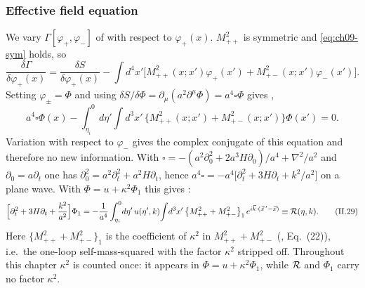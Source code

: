 \subsubsection{Effective field equation}
We vary $\Gamma[\varphi_+,\varphi_-]$ of  with respect to $\varphi_+(x)$. $M^2_{++}$ is symmetric and \eqref{eq:ch09-sym} holds, so
\begin{equation}
\frac{\delta\Gamma}{\delta\varphi_+(x)}=\frac{\delta S}{\delta\varphi_+(x)}-\int d^4x'\Big[M^2_{++}(x;x')\varphi_+(x')+M^2_{+-}(x;x')\varphi_-(x')\Big].
\label{eq:ch09-varGamma}
\end{equation}
Setting $\varphi_\pm=\Phi$ and using $\delta S/\delta\Phi=\partial_\mu(a^2\partial^\mu\Phi)=a^4\square\Phi$ gives ,
\begin{equation*}
a^4\square\Phi(x)-\int_{\eta_i}^0d\eta'\!\int d^3x'\,\big\{M^2_{++}(x;x')+M^2_{+-}(x;x')\big\}\Phi(x')=0 .
\tag{II.21}
\end{equation*}
Variation with respect to $\varphi_-$ gives the complex conjugate of this equation and therefore no new information.
With $\square=-(a^2\partial_0^2+2a^3H\partial_0)/a^4+\nabla^2/a^2$ and $\partial_0=a\partial_t$ one has
$\partial_0^2=a^2\partial_t^2+a^2H\partial_t$, hence $a^4\square=-a^4\big[\partial_t^2+3H\partial_t+k^2/a^2\big]$ on a plane wave. With
$\Phi=u+\kappa^2\Phi_1$ this gives :
\begin{equation*}
\Big[\partial_t^2+3H\partial_t+\frac{k^2}{a^2}\Big]\Phi_1=-\frac1{a^4}\int_{\eta_i}^0\!d\eta'\,u(\eta',k)\!\int\! d^3x'\,\big\{M^2_{++}+M^2_{+-}\big\}_1\,e^{i\vec k\cdot(\vec x\,'-\vec x)}\equiv\mathcal{R}(\eta,k).
\tag{II.29}
\label{eq:ch09-mode}
\end{equation*}
Here $\{M^2_{++}+M^2_{+-}\}_1$ is the coefficient of $\kappa^2$ in $M^2_{++}+M^2_{+-}$ (\PII, Eq.~(22)), i.e.\ the one-loop self-mass-squared with
the factor $\kappa^2$ stripped off. \tA{} Throughout this chapter $\kappa^2$ is counted once: it appears in $\Phi=u+\kappa^2\Phi_1$, while
$\mathcal{R}$ and $\Phi_1$ carry no factor $\kappa^2$.

